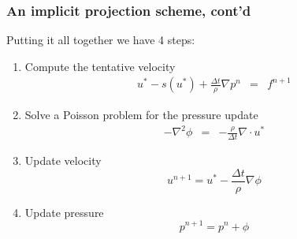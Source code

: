 \begin{frame}
\frametitle{An implicit projection scheme, cont'd}
Putting it all together we have 4 steps: 
\begin{enumerate}
\item Compute the tentative velocity 
\begin{eqnarray*}
u^* - s(u^*) + \frac{\Delta t}{\rho} \nabla p^n &=& f^{n+1}  
\end{eqnarray*}

\item Solve a Poisson problem for the pressure update 
\begin{eqnarray*}
-\nabla^2  \phi &=& -\frac{\rho}{\Delta t} \nabla \cdot u^* 
\end{eqnarray*}
\item Update velocity
\[
u^{n+1} =  u^*- \frac{\Delta t}{\rho} \nabla \phi 
\]

\item Update pressure
\[
p^{n+1} = p^n + \phi 
\]
\end{enumerate}
\end{frame}

